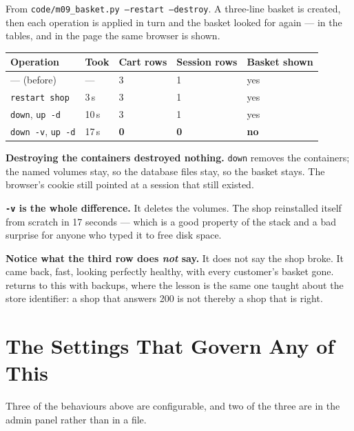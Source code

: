 \begin{measured}
From \texttt{code/m09\_basket.py --restart --destroy}. A three-line basket is
created, then each operation is applied in turn and the basket looked for again
--- in the tables, and in the page the same browser is shown.

\begin{longtable}{@{}L{3.8cm}L{1.7cm}L{2.3cm}L{2.5cm}L{2.7cm}@{}}
\toprule
{}
\textbf{Operation} & \textbf{Took} & \textbf{Cart rows} &
\textbf{Session rows} & \textbf{Basket shown} \\
\midrule
\endhead
--- (before) & --- & 3 & 1 & yes \\
\texttt{restart shop} & 3\,s & 3 & 1 & yes \\
\texttt{down}, \texttt{up -d} & 10\,s & 3 & 1 & yes \\
\texttt{down -v}, \texttt{up -d} & 17\,s & \textbf{0} & \textbf{0} &
\textbf{no} \\
\bottomrule
\end{longtable}

\smallskip
\textbf{Destroying the containers destroyed nothing.} \texttt{down} removes the
containers; the named volumes stay, so the database files stay, so the basket
stays. The browser's cookie still pointed at a session that still existed.

\smallskip
\textbf{\texttt{-v} is the whole difference.} It deletes the volumes. The shop
reinstalled itself from scratch in 17 seconds --- which is a good property of
the stack and a bad surprise for anyone who typed it to free disk space.

\smallskip
\textbf{Notice what the third row does \emph{not} say.} It does not say the
shop broke. It came back, fast, looking perfectly healthy, with every customer's
basket gone.  returns to this with backups, where the lesson is
the same one  taught about the store identifier: a shop that
answers 200 is not thereby a shop that is right.
\end{measured}

\section{The Settings That Govern Any of This}

Three of the behaviours above are configurable, and two of the three are in the
admin panel rather than in a file.

